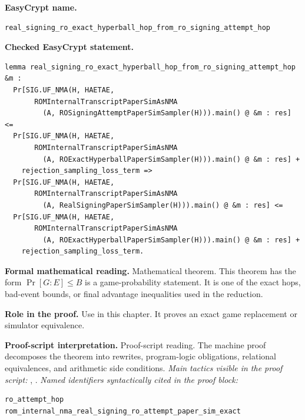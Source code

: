\begin{formaltheorem}
\noindent\textbf{EasyCrypt name.}
\begin{lstlisting}[language=EasyCrypt,basicstyle=\ttfamily\scriptsize]
real_signing_ro_exact_hyperball_hop_from_ro_signing_attempt_hop
\end{lstlisting}
\noindent\textbf{Checked EasyCrypt statement.}
\begin{lstlisting}[language=EasyCrypt,basicstyle=\ttfamily\scriptsize]
lemma real_signing_ro_exact_hyperball_hop_from_ro_signing_attempt_hop &m :
  Pr[SIG.UF_NMA(H, HAETAE,
       ROMInternalTranscriptPaperSimAsNMA
         (A, ROSigningAttemptPaperSimSampler(H))).main() @ &m : res] <=
  Pr[SIG.UF_NMA(H, HAETAE,
       ROMInternalTranscriptPaperSimAsNMA
         (A, ROExactHyperballPaperSimSampler(H))).main() @ &m : res] +
    rejection_sampling_loss_term =>
  Pr[SIG.UF_NMA(H, HAETAE,
       ROMInternalTranscriptPaperSimAsNMA
         (A, RealSigningPaperSimSampler(H))).main() @ &m : res] <=
  Pr[SIG.UF_NMA(H, HAETAE,
       ROMInternalTranscriptPaperSimAsNMA
         (A, ROExactHyperballPaperSimSampler(H))).main() @ &m : res] +
    rejection_sampling_loss_term.
\end{lstlisting}
\noindent\textbf{Formal mathematical reading.}
Mathematical theorem. This theorem has the form \(\Pr[G:E] \le B\) is a game-probability statement.  It is one of the exact hops, bad-event bounds, or final advantage inequalities used in the reduction.

\noindent\textbf{Role in the proof.}
Use in this chapter. It proves an exact game replacement or simulator equivalence.

\noindent\textbf{Proof-script interpretation.}
Proof-script reading. The machine proof decomposes the theorem into rewrites, program-logic obligations, relational equivalences, and arithmetic side conditions.
\emph{Main tactics visible in the proof script:} , .
\emph{Named identifiers syntactically cited in the proof block:}
\begin{lstlisting}[language=EasyCrypt,basicstyle=\ttfamily\scriptsize]
ro_attempt_hop
rom_internal_nma_real_signing_ro_attempt_paper_sim_exact
\end{lstlisting}

\end{formaltheorem}

